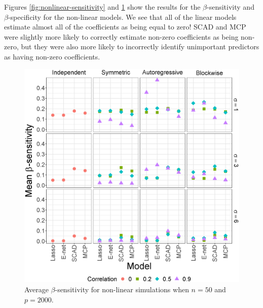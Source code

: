 \documentclass{article}
\begin{document}
	Figures \ref{fig:nonlinear-sensitivity} and \ref{fig:nonlinear-specificity} show the results for the $\beta$-sensitivity and $\beta$-specificity for the non-linear models. We see that all of the linear models estimate almost all of the coefficients as being equal to zero! SCAD and MCP were slightly more likely to correctly estimate non-zero coefficients as being non-zero, but they were also more likely to incorrectly identify unimportant predictors as having non-zero coefficients.
	\begin{figure}[h!]
		\centering
		\begin{minipage}[t]{0.47\textwidth}
			\includegraphics[width = \textwidth]{images/facet/publication_facet_sensitivity_2_50_2000.eps}
			\captionsetup{width = 0.95\textwidth}
			\caption{Average $\beta$-sensitivity for non-linear simulations when $n = 50$ and $p = 	2000$.}
			\label{fig:nonlinear-specificity}
		\end{minipage}
		\hspace{6pt}
		\begin{minipage}[t]{0.47\textwidth}

\end{minipage}
\end{figure}
\end{document}
